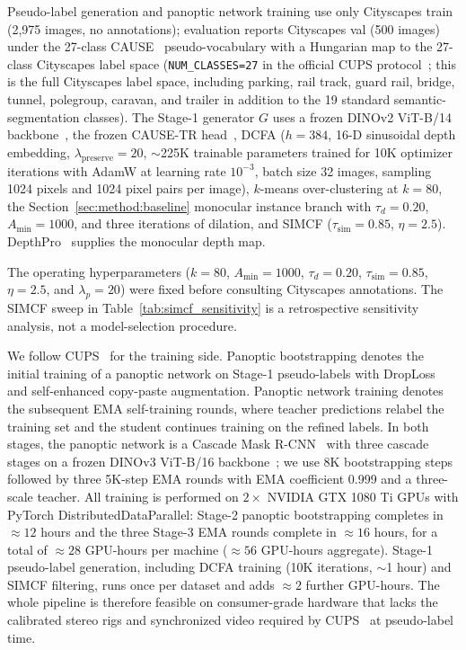 \documentclass{article}
\begin{document}
Pseudo-label generation and panoptic network training use only Cityscapes train~\cite{cordts2016cityscapes} (2,975 images, no annotations); evaluation reports Cityscapes val (500 images) under the 27-class CAUSE~\cite{kim2024cause} pseudo-vocabulary with a Hungarian map to the 27-class Cityscapes label space (\texttt{NUM\_CLASSES=27} in the official CUPS protocol~\cite{hahn2025cups}; this is the full Cityscapes label space, including parking, rail track, guard rail, bridge, tunnel, polegroup, caravan, and trailer in addition to the 19 standard semantic-segmentation classes). The Stage-1 generator $G$ uses a frozen DINOv2 ViT-B/14 backbone~\cite{oquab2024dinov2}, the frozen CAUSE-TR head~\cite{kim2024cause}, DCFA ($h = 384$, 16-D sinusoidal depth embedding, $\lambda_\text{preserve} = 20$, $\sim$225K trainable parameters trained for 10K optimizer iterations with AdamW at learning rate $10^{-3}$, batch size 32 images, sampling 1024 pixels and 1024 pixel pairs per image), $k$-means over-clustering at $k = 80$, the Section~\ref{sec:method:baseline} monocular instance branch with $\tau_d = 0.20$, $A_\text{min} = 1000$, and three iterations of dilation, and SIMCF ($\tau_\text{sim} = 0.85$, $\eta = 2.5$). DepthPro~\cite{bochkovskii2024depthpro} supplies the monocular depth map.

The operating hyperparameters ($k=80$, $A_\text{min}=1000$, $\tau_d=0.20$, $\tau_\text{sim}=0.85$, $\eta=2.5$, and $\lambda_p=20$) were fixed before consulting Cityscapes annotations. The SIMCF sweep in Table~\ref{tab:simcf_sensitivity} is a retrospective sensitivity analysis, not a model-selection procedure.

We follow CUPS~\cite{hahn2025cups} for the training side. Panoptic bootstrapping denotes the initial training of a panoptic network on Stage-1 pseudo-labels with DropLoss~\cite{wang2023cutler} and self-enhanced copy-paste augmentation. Panoptic network training denotes the subsequent EMA self-training rounds, where teacher predictions relabel the training set and the student continues training on the refined labels. In both stages, the panoptic network is a Cascade Mask R-CNN~\cite{cai2018cascade} with three cascade stages on a frozen DINOv3 ViT-B/16 backbone~\cite{simeoni2025dinov3}; we use 8K bootstrapping steps followed by three 5K-step EMA rounds with EMA coefficient 0.999 and a three-scale teacher. All training is performed on $2 \times$ NVIDIA GTX 1080 Ti GPUs with PyTorch DistributedDataParallel: Stage-2 panoptic bootstrapping completes in $\approx 12$ hours and the three Stage-3 EMA rounds complete in $\approx 16$ hours, for a total of $\approx 28$ GPU-hours per machine ($\approx 56$ GPU-hours aggregate). Stage-1 pseudo-label generation, including DCFA training (10K iterations, $\sim$1 hour) and SIMCF filtering, runs once per dataset and adds $\approx 2$ further GPU-hours. The whole pipeline is therefore feasible on consumer-grade hardware that lacks the calibrated stereo rigs and synchronized video required by CUPS~\cite{hahn2025cups} at pseudo-label time.
\end{document}
